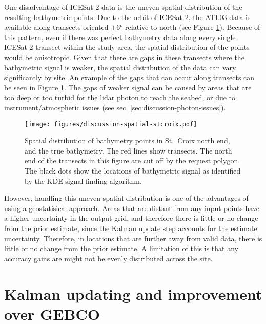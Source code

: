 One disadvantage of ICESat-2 data is the uneven spatial distribution of the resulting bathymetric points. Due to the orbit of ICESat-2, the ATL03 data is available along transects oriented $\pm \ang{6}$ relative to north (see Figure \ref{fig:distribution-of-bathy-points-in-space}). Because of this pattern, even if there was perfect bathymetry data along every single ICESat-2 transect within the study area, the spatial distribution of the points would be anisotropic. Given that there are gaps in these transects where the bathymetric signal is weaker, the spatial distribution of the data can vary significantly by site. An example of the gaps that can occur along transects can be seen in Figure \ref{fig:distribution-of-bathy-points-in-space}. The gaps of weaker signal can be caused by areas that are too deep or too turbid for the lidar photon to reach the seabed, or due to instrument/atmospheric issues (see sec. \ref{sec:discussion-photon-issues}). 


\begin{figure}
    \centering
    \texttt{[image: figures/discussion-spatial-stcroix.pdf]}
    \caption[Spatial distribution of bathymetry points in St.~Croix north end]{Spatial distribution of bathymetry points in St.~Croix north end, and the true bathymetry. The red lines show transects. The north end of the transects in this figure are cut off by the request polygon. The black dots show the locations of bathymetric signal as identified by the KDE signal finding algorithm.}
    \label{fig:distribution-of-bathy-points-in-space}
\end{figure}

However, handling this uneven spatial distribution is one of the advantages of using a geostatisical approach. Areas that are distant from any input points have a higher uncertainty in the output grid, and therefore there is little or no change from the prior estimate, since the Kalman update step accounts for the estimate uncertainty. Therefore, in locations that are further away from valid data, there is little or no change from the prior estimate. A limitation of this is that any accuracy gains are might not be evenly distributed across the site. 

\section{Kalman updating and improvement over GEBCO}

